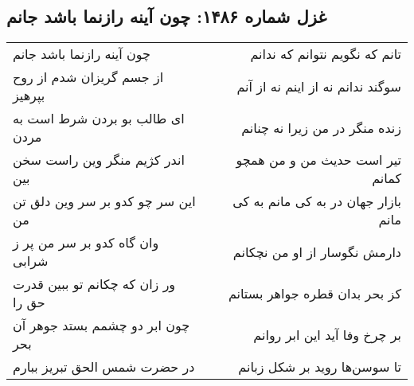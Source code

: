 \begin{center}
\section*{غزل شماره ۱۴۸۶: چون آینه رازنما باشد جانم}
\label{sec:1486}
\begin{longtable}{l p{0.5cm} r}
چون آینه رازنما باشد جانم
&&
تانم که نگویم نتوانم که ندانم
\\
از جسم گریزان شدم از روح بپرهیز
&&
سوگند ندانم نه از اینم نه از آنم
\\
ای طالب بو بردن شرط است به مردن
&&
زنده منگر در من زیرا نه چنانم
\\
اندر کژیم منگر وین راست سخن بین
&&
تیر است حدیث من و من همچو کمانم
\\
این سر چو کدو بر سر وین دلق تن من
&&
بازار جهان در به کی مانم به کی مانم
\\
وان گاه کدو بر سر من پر ز شرابی
&&
دارمش نگوسار از او من نچکانم
\\
ور زان که چکانم تو ببین قدرت حق را
&&
کز بحر بدان قطره جواهر بستانم
\\
چون ابر دو چشمم بستد جوهر آن بحر
&&
بر چرخ وفا آید این ابر روانم
\\
در حضرت شمس الحق تبریز ببارم
&&
تا سوسن‌ها روید بر شکل زبانم
\\
\end{longtable}
\end{center}

